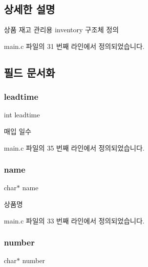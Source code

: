 \subsection{상세한 설명}
상품 재고 관리용 inventory 구조체 정의 

main.\+c 파일의 31 번째 라인에서 정의되었습니다.



\subsection{필드 문서화}
\mbox{\label{structinventory_ae0484109745ac918f2b3ed8551b41dcb}} 
\subsubsection{\texorpdfstring{leadtime}{leadtime}}
{\footnotesize\ttfamily int leadtime}



매입 일수 



main.\+c 파일의 35 번째 라인에서 정의되었습니다.

\mbox{\label{structinventory_a5ac083a645d964373f022d03df4849c8}} 
\subsubsection{\texorpdfstring{name}{name}}
{\footnotesize\ttfamily char$\ast$ name}



상품명 



main.\+c 파일의 33 번째 라인에서 정의되었습니다.

\mbox{\label{structinventory_a77370bcefb3fe21e5f84e230581a50d7}} 
\subsubsection{\texorpdfstring{number}{number}}
{\footnotesize\ttfamily char$\ast$ number}



